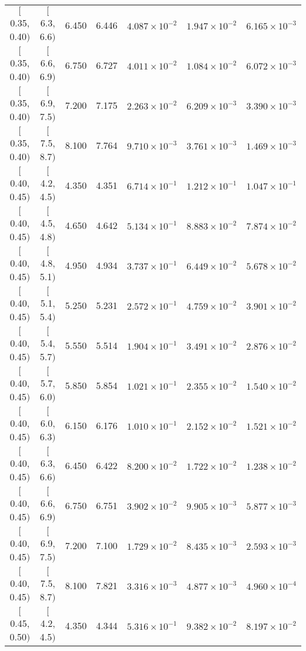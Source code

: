 \begin{longtable}{| c | c | c | c | c | c | c |}
$[$0.35, 0.40$)$ & $[$6.3, 6.6$)$ & 6.450 & 6.446 & $4.087 \times 10^{-2}$ & $1.947 \times 10^{-2}$ & $6.165 \times 10^{-3}$ \\
$[$0.35, 0.40$)$ & $[$6.6, 6.9$)$ & 6.750 & 6.727 & $4.011 \times 10^{-2}$ & $1.084 \times 10^{-2}$ & $6.072 \times 10^{-3}$ \\
$[$0.35, 0.40$)$ & $[$6.9, 7.5$)$ & 7.200 & 7.175 & $2.263 \times 10^{-2}$ & $6.209 \times 10^{-3}$ & $3.390 \times 10^{-3}$ \\
$[$0.35, 0.40$)$ & $[$7.5, 8.7$)$ & 8.100 & 7.764 & $9.710 \times 10^{-3}$ & $3.761 \times 10^{-3}$ & $1.469 \times 10^{-3}$ \\
\hline
$[$0.40, 0.45$)$ & $[$4.2, 4.5$)$ & 4.350 & 4.351 & $6.714 \times 10^{-1}$ & $1.212 \times 10^{-1}$ & $1.047 \times 10^{-1}$ \\
$[$0.40, 0.45$)$ & $[$4.5, 4.8$)$ & 4.650 & 4.642 & $5.134 \times 10^{-1}$ & $8.883 \times 10^{-2}$ & $7.874 \times 10^{-2}$ \\
$[$0.40, 0.45$)$ & $[$4.8, 5.1$)$ & 4.950 & 4.934 & $3.737 \times 10^{-1}$ & $6.449 \times 10^{-2}$ & $5.678 \times 10^{-2}$ \\
$[$0.40, 0.45$)$ & $[$5.1, 5.4$)$ & 5.250 & 5.231 & $2.572 \times 10^{-1}$ & $4.759 \times 10^{-2}$ & $3.901 \times 10^{-2}$ \\
$[$0.40, 0.45$)$ & $[$5.4, 5.7$)$ & 5.550 & 5.514 & $1.904 \times 10^{-1}$ & $3.491 \times 10^{-2}$ & $2.876 \times 10^{-2}$ \\
$[$0.40, 0.45$)$ & $[$5.7, 6.0$)$ & 5.850 & 5.854 & $1.021 \times 10^{-1}$ & $2.355 \times 10^{-2}$ & $1.540 \times 10^{-2}$ \\
$[$0.40, 0.45$)$ & $[$6.0, 6.3$)$ & 6.150 & 6.176 & $1.010 \times 10^{-1}$ & $2.152 \times 10^{-2}$ & $1.521 \times 10^{-2}$ \\
$[$0.40, 0.45$)$ & $[$6.3, 6.6$)$ & 6.450 & 6.422 & $8.200 \times 10^{-2}$ & $1.722 \times 10^{-2}$ & $1.238 \times 10^{-2}$ \\
$[$0.40, 0.45$)$ & $[$6.6, 6.9$)$ & 6.750 & 6.751 & $3.902 \times 10^{-2}$ & $9.905 \times 10^{-3}$ & $5.877 \times 10^{-3}$ \\
$[$0.40, 0.45$)$ & $[$6.9, 7.5$)$ & 7.200 & 7.100 & $1.729 \times 10^{-2}$ & $8.435 \times 10^{-3}$ & $2.593 \times 10^{-3}$ \\
$[$0.40, 0.45$)$ & $[$7.5, 8.7$)$ & 8.100 & 7.821 & $3.316 \times 10^{-3}$ & $4.877 \times 10^{-3}$ & $4.960 \times 10^{-4}$ \\
\hline
$[$0.45, 0.50$)$ & $[$4.2, 4.5$)$ & 4.350 & 4.344 & $5.316 \times 10^{-1}$ & $9.382 \times 10^{-2}$ & $8.197 \times 10^{-2}$ \\

\end{longtable}
